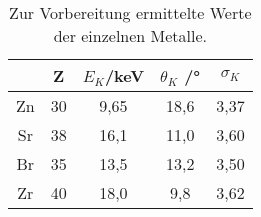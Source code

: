 \begin{table}[H]
  \centering
   \begin{tabular}{c c c c c}
    \toprule
     & Z & $E_{K}$/\;keV & $\theta_{K}$ /\;° & $\sigma_{K}$ \\
    \midrule
    Zn & 30 & 9,65 & 18,6 & 3,37\\
    Sr & 38 & 16,1 & 11,0 & 3,60\\
    Br & 35 & 13,5 & 13,2 & 3,50\\
    Zr & 40 & 18,0 & 9,8 & 3,62 \\
    \bottomrule
  \end{tabular}
  \caption{Zur Vorbereitung ermittelte Werte der einzelnen Metalle.}
  \label{tab:tabvor}
\end{table}

